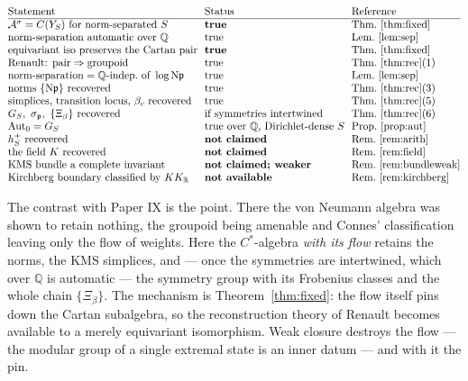 \documentclass[11pt]{amsart}
\numberwithin{equation}{section}
\theoremstyle{definition}
\theoremstyle{remark}
\newcommand{\Q}{\mathbb{Q}}
\newcommand{\R}{\mathbb{R}}
\newcommand{\cA}{\mathcal{A}}
\newcommand{\pp}{\mathfrak{p}}
\newcommand{\Ns}{\mathrm{N}}
\begin{document}
\[
\begin{array}{@{}l@{\ \ }l@{\ \ }l@{}}
\text{Statement} & \text{Status} & \text{Reference}\\\hline
\cA^\sigma=C(Y_S)\ \text{for norm-separated }S & \textbf{true} & \text{Thm.~\ref{thm:fixed}}\\
\text{norm-separation automatic over }\Q & \text{true} & \text{Lem.~\ref{lem:sep}}\\
\text{equivariant iso preserves the Cartan pair} & \textbf{true} & \text{Thm.~\ref{thm:fixed}}\\
\text{Renault: pair}\Rightarrow\text{groupoid} & \text{true} & \text{Thm.~\ref{thm:rec}(1)}\\
\text{norm-separation}=\Q\text{-indep.\ of }\log\Ns\pp & \text{true} & \text{Lem.~\ref{lem:sep}}\\
\text{norms }\{\Ns\pp\}\ \text{recovered} & \text{true} & \text{Thm.~\ref{thm:rec}(3)}\\
\text{simplices, transition locus, }\beta_c\ \text{recovered} & \text{true} & \text{Thm.~\ref{thm:rec}(5)}\\
G_S,\ \sigma_\pp,\ \{\Xi_\beta\}\ \text{recovered} & \text{if symmetries intertwined} & \text{Thm.~\ref{thm:rec}(6)}\\
\operatorname{Aut}_0=G_S & \text{true over }\Q\text{, Dirichlet-dense }S & \text{Prop.~\ref{prop:aut}}\\
h^+_S\ \text{recovered} & \textbf{not claimed} & \text{Rem.~\ref{rem:arith}}\\
\text{the field }K\ \text{recovered} & \textbf{not claimed} & \text{Rem.~\ref{rem:field}}\\
\text{KMS bundle a complete invariant} & \textbf{not claimed; weaker} & \text{Rem.~\ref{rem:bundleweak}}\\
\text{Kirchberg boundary classified by }KK_\R & \textbf{not available} & \text{Rem.~\ref{rem:kirchberg}}
\end{array}
\]

The contrast with Paper IX is the point. There the von Neumann algebra was shown to
retain nothing, the groupoid being amenable and Connes' classification leaving only the flow
of weights. Here the $C^*$-algebra \emph{with its flow} retains the norms, the
$\mathrm{KMS}$ simplices, and --- once the symmetries are intertwined, which over $\Q$ is
automatic --- the symmetry group with its Frobenius classes and the whole chain
$\{\Xi_\beta\}$. The mechanism is
Theorem~\ref{thm:fixed}: the flow itself pins down the Cartan subalgebra, so the
reconstruction theory of Renault becomes available to a merely equivariant isomorphism. Weak
closure destroys the flow --- the modular group of a single extremal state is an inner
datum --- and with it the pin.
\end{document}

